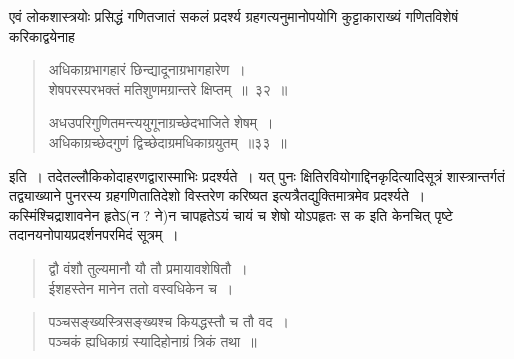 \documentclass[11pt, openany]{book}
\begin{document}
एवं लोकशास्त्रयोः प्रसिद्धं गणितजातं सकलं प्रदर्श्य ग्रहगत्यनुमानोपयोगि कुट्टाकाराख्यं गणितविशेषं करिकाद्वयेनाह\textendash

\begin{quote}
{\ab अधिकाग्रभागहारं छिन्द्यादूनाग्रभागहारेण~।\\
शेषपरस्परभक्तं मतिशुणमग्रान्तरे क्षिप्तम्~॥~३२~॥
			
अधउपरिगुणितमन्त्ययुगूनाग्रच्छेदभाजिते शेषम्~।\\
अधिकाग्रच्छेदगुणं द्विच्छेदाग्रमधिकाग्रयुतम्~॥३३~॥}
\end{quote}

इति~। तदेतल्लौकिकोदाहरणद्वारास्माभिः प्रदर्श्यते~। यत् पुनः {\qt क्षितिरवियोगाद्दिनकृदि}त्यादिसूत्रं शास्त्रान्तर्गतं तद्व्याख्याने पुनरस्य ग्रहगणितातिदेशो विस्तरेण करिष्यत इत्यत्रैतद्युक्तिमात्रमेव प्रदर्श्यते~। कस्मिंश्चिद्राशावनेन हृतेऽ(न ? ने)न चापहृतेऽयं चायं च शेषो योऽपहृतः स क इति केनचित् पृष्टे तदानयनोपायप्रदर्शनपरमिदं सूत्रम्~।

\begin{quote}
{\qt द्वौ वंशौ तुल्यमानौ यौ तौ प्रमायावशेषितौ~।\\
ईशहस्तेन मानेन ततो वस्वधिकेन च~।}
\end{quote}

\newpage

\begin{quote}
{\qt पञ्चसङ्ख्यस्त्रिसङ्ख्यश्च कियद्धस्तौ च तौ वद~।\\
पञ्चकं ह्यधिकाग्रं स्यादिहोनाग्रं त्रिकं तथा~॥}
\end{quote}
\end{document}
